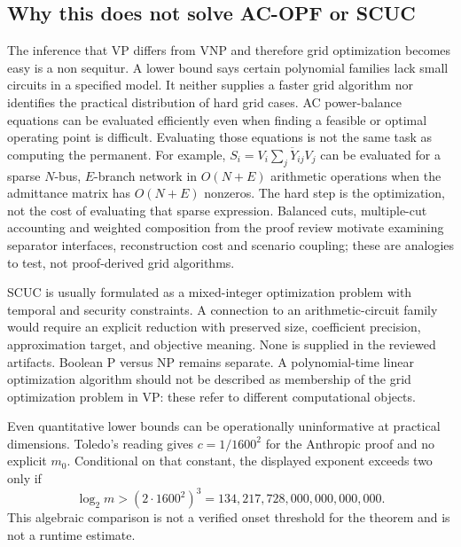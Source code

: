 \documentclass[11pt,letterpaper]{article}
\begin{document}
\subsection{Why this does not solve AC-OPF or SCUC}
The inference that VP differs from VNP and therefore grid optimization becomes easy is a non sequitur. A lower bound says certain polynomial families lack small circuits in a specified model. It neither supplies a faster grid algorithm nor identifies the practical distribution of hard grid cases. AC power-balance equations can be evaluated efficiently even when finding a feasible or optimal operating point is difficult. Evaluating those equations is not the same task as computing the permanent. For example, $S_i=V_i\overline{\sum_jY_{ij}V_j}$ can be evaluated for a sparse $N$-bus, $E$-branch network in $O(N+E)$ arithmetic operations when the admittance matrix has $O(N+E)$ nonzeros. The hard step is the optimization, not the cost of evaluating that sparse expression. Balanced cuts, multiple-cut accounting and weighted composition from the proof review motivate examining separator interfaces, reconstruction cost and scenario coupling; these are analogies to test, not proof-derived grid algorithms.

SCUC is usually formulated as a mixed-integer optimization problem with temporal and security constraints. A connection to an arithmetic-circuit family would require an explicit reduction with preserved size, coefficient precision, approximation target, and objective meaning. None is supplied in the reviewed artifacts. Boolean P versus NP remains separate. A polynomial-time linear optimization algorithm should not be described as membership of the grid optimization problem in VP: these refer to different computational objects.

Even quantitative lower bounds can be operationally uninformative at practical dimensions. Toledo's reading gives $c=1/1600^2$ for the Anthropic proof and no explicit $m_0$.\cite{toledo} Conditional on that constant, the displayed exponent exceeds two only if
\[
 \log_2m>(2\cdot1600^2)^3
   =134{,}217{,}728{,}000{,}000{,}000{,}000.
\]
This algebraic comparison is not a verified onset threshold for the theorem and is not a runtime estimate.
\end{document}
